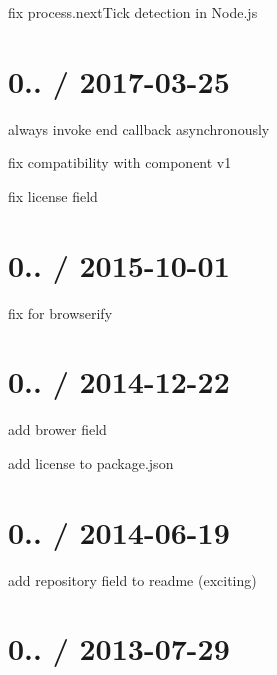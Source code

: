 
\begin{DoxyItemize}
\item fix {\ttfamily process.\+next\+Tick} detection in Node.\+js
\end{DoxyItemize}

\section*{0.. / 2017-\/03-\/25 }


\begin{DoxyItemize}
\item always invoke end callback asynchronously
\item fix compatibility with component v1
\item fix license field
\end{DoxyItemize}

\section*{0.. / 2015-\/10-\/01 }


\begin{DoxyItemize}
\item fix for browserify
\end{DoxyItemize}

\section*{0.. / 2014-\/12-\/22 }


\begin{DoxyItemize}
\item add brower field
\item add license to package.\+json
\end{DoxyItemize}

\section*{0.. / 2014-\/06-\/19 }


\begin{DoxyItemize}
\item add repository field to readme (exciting)
\end{DoxyItemize}

\section*{0.. / 2013-\/07-\/29 }


